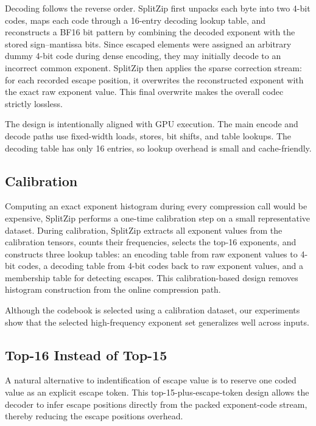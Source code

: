 Decoding follows the reverse order. 
SplitZip first unpacks each byte into two 4-bit codes, maps each code through a 16-entry decoding lookup table, and reconstructs a BF16 bit pattern by combining the decoded exponent with the stored sign--mantissa bits. 
Since escaped elements were assigned an arbitrary dummy 4-bit code during dense encoding, they may initially decode to an incorrect common exponent. 
SplitZip then applies the sparse correction stream: for each recorded escape position, it overwrites the reconstructed exponent with the exact raw exponent value. 
This final overwrite makes the overall codec strictly lossless.

The design is intentionally aligned with GPU execution. 
The main encode and decode paths use fixed-width loads, stores, bit shifts, and table lookups. 
The decoding table has only 16 entries, so lookup overhead is small and cache-friendly. 

\subsection{Calibration}
\label{sec:method_calibration}

Computing an exact exponent histogram during every compression call would be expensive, SplitZip performs a one-time calibration step on a small representative dataset. 
During calibration, SplitZip extracts all exponent values from the calibration tensors, counts their frequencies, selects the top-16 exponents, and constructs three lookup tables: an encoding table from raw exponent values to 4-bit codes, a decoding table from 4-bit codes back to raw exponent values, and a membership table for detecting escapes. This calibration-based design removes histogram construction from the online compression path. 

Although the codebook is selected using a calibration dataset, our experiments show that the selected high-frequency exponent set generalizes well across inputs. 

\subsection{Top-16 Instead of Top-15}
\label{sec:method_top16}

A natural alternative to indentification of escape value is to reserve one coded value as an explicit escape token.
This top-15-plus-escape-token design allows the decoder to infer escape positions directly from the packed exponent-code stream, thereby reducing the escape positions overhead. 

